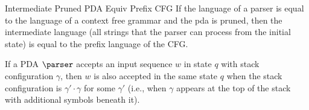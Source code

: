 \begin{theorem}{Intermediate Pruned PDA Equiv Prefix CFG}
    \label{thm:IntermediatePrunedPDAPrefixCFG}
    If the language of a parser is equal to the language of a context free grammar and the pda is pruned, then the intermediate language (all strings that the parser can process from the initial state) is equal to the prefix language of the CFG.
\end{theorem}

\begin{lemma}
    \label{lem:PDAStackInvariance}
    If a PDA $\parser$ accepts an input sequence $w$ in state $q$ with stack configuration $\gamma$, then $w$ is also accepted in the same state $q$ when the stack configuration is $\gamma' \cdot \gamma$ for some $\gamma'$ (i.e., when $\gamma$ appears at the top of the stack with additional symbols beneath it).
\end{lemma}

